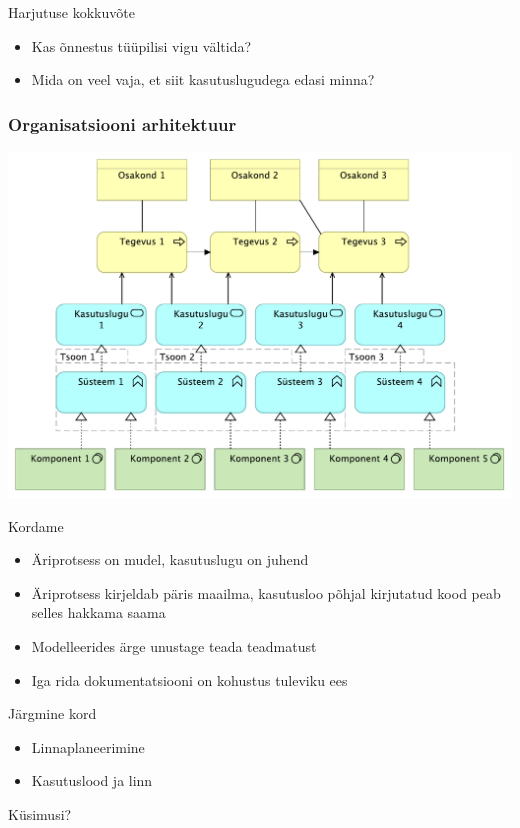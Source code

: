 \documentclass{beamer}
\begin{document}
\begin{frame}{Harjutuse kokkuvõte}
	\begin{itemize}
		\item Kas õnnestus tüüpilisi vigu vältida?
		\item Mida on veel vaja, et siit kasutuslugudega edasi minna? 
	\end{itemize}
\end{frame}

\begin{frame}[fragile]
	\frametitle{Organisatsiooni arhitektuur}

	\begin{center}
	\includegraphics[width=.9\textwidth]{kihid.pdf}
	\end{center}
\end{frame}


\begin{frame}{Kordame}
	\begin{itemize}
		\item Äriprotsess on mudel, kasutuslugu on juhend
		\item Äriprotsess kirjeldab päris maailma, kasutusloo põhjal kirjutatud kood peab selles hakkama saama
		\item Modelleerides ärge unustage teada teadmatust
		\item Iga rida dokumentatsiooni on kohustus tuleviku ees
	\end{itemize}
\end{frame}

\begin{frame}{Järgmine kord}
\begin{itemize}
	\item Linnaplaneerimine
	\item Kasutuslood ja linn
	\end{itemize}
\end{frame}

%	
%	

\begin{frame}[standout]
Küsimusi?
\end{frame}
\end{document}
